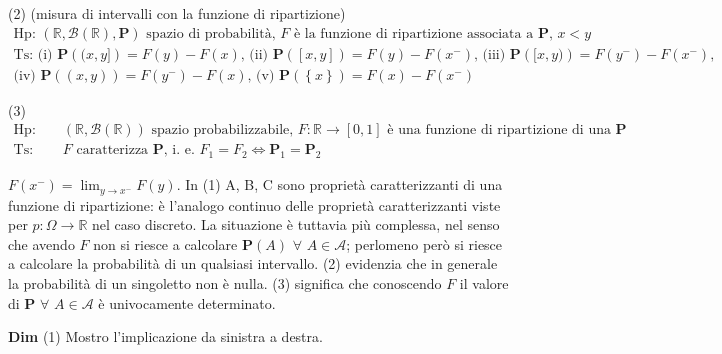 \documentclass{article}
\begin{document}
(2) (misura di intervalli con la funzione di ripartizione)%
\begin{gather*}
\text{Hp: }\left( 
\mathbb{R}
,\mathcal{B}\left( 
\mathbb{R}
\right) ,\mathbf{P}\right) \text{ spazio di probabilit\`{a}, }F\text{ \`{e}
la funzione di ripartizione associata a }\mathbf{P}\text{, }x<y \\
\text{Ts: (i) }\mathbf{P}\left( (x,y]\right) =F\left( y\right) -F\left(
x\right) \text{, (ii) }\mathbf{P}\left( [x,y]\right) =F\left( y\right)
-F\left( x^{-}\right) \text{, (iii) }\mathbf{P}\left( [x,y)\right) =F\left(
y^{-}\right) -F\left( x^{-}\right) \text{,} \\
\text{(iv) }\mathbf{P}\left( (x,y)\right) =F\left( y^{-}\right) -F\left(
x\right) \text{, (v) }\mathbf{P}\left( \left\{ x\right\} \right) =F\left(
x\right) -F\left( x^{-}\right)
\end{gather*}

(3)
\begin{eqnarray*}
\text{Hp}\text{: } &&\left( 
\mathbb{R}
,\mathcal{B}\left( 
\mathbb{R}
\right) \right) \text{ spazio probabilizzabile, }F:%
\mathbb{R}
\rightarrow \left[ 0,1\right] \text{ \`{e} una funzione di ripartizione di
una }\mathbf{P} \\
\text{Ts}\text{: } &&F\text{ caratterizza }\mathbf{P}\text{, i. e. }%
F_{1}=F_{2}\Longleftrightarrow \mathbf{P}_{1}=\mathbf{P}_{2}
\end{eqnarray*}

$F\left( x^{-}\right) =\lim_{y\rightarrow x^{-}}F\left( y\right) $. In (1)
A, B, C sono propriet\`{a} caratterizzanti di una funzione di ripartizione: 
\`{e} l'analogo continuo delle propriet\`{a} caratterizzanti viste per $%
p:\Omega \rightarrow 
\mathbb{R}
$ nel caso discreto. La situazione \`{e} tuttavia pi\`{u} complessa, nel
senso che avendo $F$ non si riesce a calcolare $\mathbf{P}\left( A\right) $ $%
\forall $ $A\in \mathcal{A}$; perlomeno per\`{o} si riesce a calcolare la probabilit\`{a} di
un qualsiasi intervallo. (2) evidenzia che in generale la probabilit\`{a} di
un singoletto non \`{e} nulla. (3) significa che conoscendo $F$ il valore di 
$\mathbf{P}$ $\forall $ $A\in \mathcal{A}$ \`{e} univocamente determinato.

\textbf{Dim} (1) Mostro l'implicazione da sinistra a destra.
\end{document}
